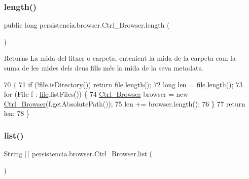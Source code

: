 \subsubsection{\texorpdfstring{length()}{length()}}
{\footnotesize\ttfamily public long persistencia.\+browser.\+Ctrl\+\_\+\+Browser.\+length (\begin{DoxyParamCaption}{ }\end{DoxyParamCaption})\hspace{0.3cm}{\ttfamily [inline]}}

\begin{DoxyReturn}{Returns}
La mida del fitxer o carpeta, entenient la mida de la carpeta com la suma de les mides dels deus fills més la mida de la seva metadata. 
\end{DoxyReturn}

\begin{DoxyCode}
70                          \{
71         \textcolor{keywordflow}{if} (!\hyperlink{classpersistencia_1_1browser_1_1Ctrl__Browser_a72c151aed575c0848f7dbb1609b373c8}{file}.isDirectory()) \textcolor{keywordflow}{return} \hyperlink{classpersistencia_1_1browser_1_1Ctrl__Browser_a72c151aed575c0848f7dbb1609b373c8}{file}.length();
72         \textcolor{keywordtype}{long} len = \hyperlink{classpersistencia_1_1browser_1_1Ctrl__Browser_a72c151aed575c0848f7dbb1609b373c8}{file}.length();
73         \textcolor{keywordflow}{for} (File f : \hyperlink{classpersistencia_1_1browser_1_1Ctrl__Browser_a72c151aed575c0848f7dbb1609b373c8}{file}.listFiles()) \{
74             \hyperlink{classpersistencia_1_1browser_1_1Ctrl__Browser_a6cd8687a9748fc4c169d1d72be7081b1}{Ctrl\_Browser} browser = \textcolor{keyword}{new} \hyperlink{classpersistencia_1_1browser_1_1Ctrl__Browser_a6cd8687a9748fc4c169d1d72be7081b1}{Ctrl\_Browser}(f.getAbsolutePath());
75             len += browser.length();
76         \}
77         \textcolor{keywordflow}{return} len;
78     \}
\end{DoxyCode}
\mbox{\label{classpersistencia_1_1browser_1_1Ctrl__Browser_abbf52c645a931fb8e5f727c2c99af97a}} 
\subsubsection{\texorpdfstring{list()}{list()}}
{\footnotesize\ttfamily String \mbox{[}$\,$\mbox{]} persistencia.\+browser.\+Ctrl\+\_\+\+Browser.\+list (\begin{DoxyParamCaption}{ }\end{DoxyParamCaption})\hspace{0.3cm}{\ttfamily [inline]}}


